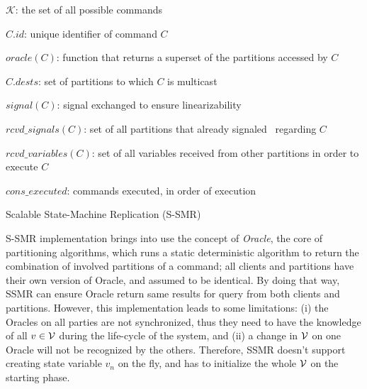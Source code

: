 \begin{algorithm}[h!]
\begin{distribalgo}[1]
\vspace{1.25mm}

$\mathcal{K}$: the set of all possible commands

\vspace{1mm}

$C.id$: unique identifier of command $C$

\vspace{1mm}

$oracle(C)$: function that returns a superset of the partitions accessed by $C$

\vspace{1mm}

$C.dests$: set of partitions to which $C$ is multicast

\vspace{1mm}

%

$signal(C)$: signal exchanged to ensure linearizability

\vspace{1mm}

$rcvd\_signals(C)$: set of all partitions that already signaled \pp\ regarding $C$

\vspace{1mm}

$rcvd\_variables(C)$: set of all variables received from other partitions in order to execute $C$

\vspace{1mm}

$cons\_executed$: commands executed, in order of execution

\caption{Scalable State-Machine Replication (S-SMR)}
\label{alg:ssmr}
\end{distribalgo}
\end{algorithm}


S-SMR implementation brings into use the concept of \emph{Oracle}, the core of partitioning algorithms, which runs a static deterministic algorithm to return the combination of involved partitions of a command; all clients and partitions have their own version of Oracle, and assumed to be identical. By doing that way, SSMR can ensure Oracle return same results for query from both clients and partitions. However, this implementation leads to some limitations: (i) the Oracles on all parties are not synchronized, thus they need to have the knowledge of all $v \in \mathcal{V}$ during the life-cycle of the system, and (ii) a change in $\mathcal{V}$ on one Oracle will not be recognized by the others. Therefore, SSMR doesn't support creating state variable $v_n$ on the fly, and has to initialize the whole $\mathcal{V}$ on the starting phase.
